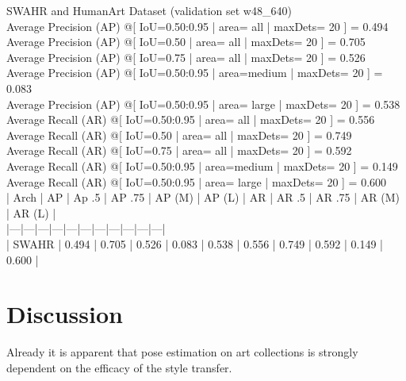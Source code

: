 SWAHR and HumanArt Dataset (validation set w48\_640)\\
Average Precision  (AP) @[ IoU=0.50:0.95 | area=   all | maxDets= 20 ] = 0.494\\
Average Precision  (AP) @[ IoU=0.50      | area=   all | maxDets= 20 ] = 0.705\\
Average Precision  (AP) @[ IoU=0.75      | area=   all | maxDets= 20 ] = 0.526\\
Average Precision  (AP) @[ IoU=0.50:0.95 | area=medium | maxDets= 20 ] = 0.083\\
Average Precision  (AP) @[ IoU=0.50:0.95 | area= large | maxDets= 20 ] = 0.538\\
Average Recall     (AR) @[ IoU=0.50:0.95 | area=   all | maxDets= 20 ] = 0.556\\
Average Recall     (AR) @[ IoU=0.50      | area=   all | maxDets= 20 ] = 0.749\\
Average Recall     (AR) @[ IoU=0.75      | area=   all | maxDets= 20 ] = 0.592\\
Average Recall     (AR) @[ IoU=0.50:0.95 | area=medium | maxDets= 20 ] = 0.149\\
Average Recall     (AR) @[ IoU=0.50:0.95 | area= large | maxDets= 20 ] = 0.600\\
| Arch | AP | Ap .5 | AP .75 | AP (M) | AP (L) | AR | AR .5 | AR .75 | AR (M) | AR (L) |\\
|---|---|---|---|---|---|---|---|---|---|---|\\
| SWAHR | 0.494 | 0.705 | 0.526 | 0.083 | 0.538 | 0.556 | 0.749 | 0.592 | 0.149 | 0.600 |\\

\section{Discussion}
\label{sec:baseline_discussion}
Already it is apparent that pose estimation on art collections is strongly dependent on the efficacy of the style transfer.

